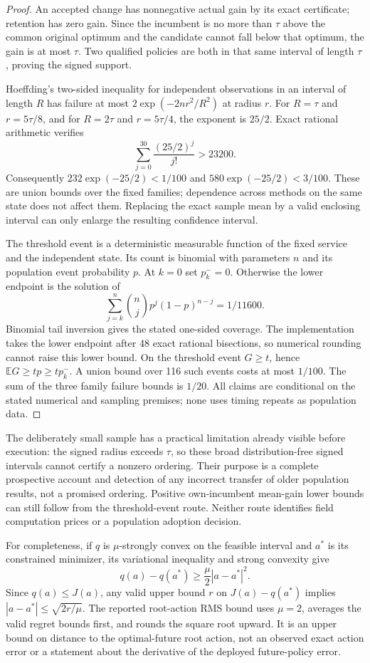 \begin{proof}
An accepted change has nonnegative actual gain by its exact certificate;
retention has zero gain. Since the incumbent is no more than $\tau$
above the common original optimum and the candidate cannot fall below
that optimum, the gain is at most $\tau$. Two qualified policies are
both in that same interval of length $\tau$, proving the signed support.

Hoeffding's two-sided inequality for independent observations in an
interval of length $R$ has failure at most
$2\exp(-2nr^2/R^2)$ at radius $r$. For $R=\tau$ and
$r=5\tau/8$, and for $R=2\tau$ and $r=5\tau/4$, the exponent is
$25/2$. Exact rational arithmetic verifies
\[
 \sum_{j=0}^{30}\frac{(25/2)^j}{j!}>23200.
\]
Consequently $232\exp(-25/2)<1/100$ and
$580\exp(-25/2)<3/100$. These are union bounds over the fixed
families; dependence across methods on the same state does not affect
them. Replacing the exact sample mean by a valid enclosing interval
can only enlarge the resulting confidence interval.

The threshold event is a deterministic measurable function of the
fixed service and the independent state. Its count is binomial with
parameters $n$ and its population event probability $p$. At $k=0$
set $p_k^-=0$. Otherwise the lower endpoint is the solution of
\[
 \sum_{j=k}^{n}{n\choose j}p^j(1-p)^{n-j}=1/11600.
\]
Binomial tail inversion gives the stated one-sided coverage. The
implementation takes the lower endpoint after 48 exact rational
bisections, so numerical rounding cannot raise this lower bound.
On the threshold event $G\ge t$, hence
$\mathbb E G\ge t p\ge t p_k^-$. A union bound over 116 such
events costs at most $1/100$. The sum of the three family failure
bounds is $1/20$. All claims are conditional on the stated numerical
and sampling premises; none uses timing repeats as population data.
\end{proof}

The deliberately small sample has a practical limitation already visible
before execution: the signed radius exceeds $\tau$, so these broad
distribution-free signed intervals cannot certify a nonzero ordering.
Their purpose is a complete prospective account and detection of any
incorrect transfer of older population results, not a promised ordering.
Positive own-incumbent mean-gain lower bounds can still follow from the
threshold-event route. Neither route identifies field computation prices
or a population adoption decision.

For completeness, if $q$ is $\mu$-strongly convex on the feasible
interval and $a^*$ is its constrained minimizer, its variational
inequality and strong convexity give
\[
 q(a)-q(a^*)\ge\frac{\mu}{2}|a-a^*|^2.
\]
Since $q(a)\le J(a)$, any valid upper bound $r$ on
$J(a)-q(a^*)$ implies $|a-a^*|\le\sqrt{2r/\mu}$.
The reported root-action RMS bound uses $\mu=2$, averages the valid
regret bounds first, and rounds the square root upward. It is an upper
bound on distance to the optimal-future root action, not an observed
exact action error or a statement about the derivative of the deployed
future-policy error.
